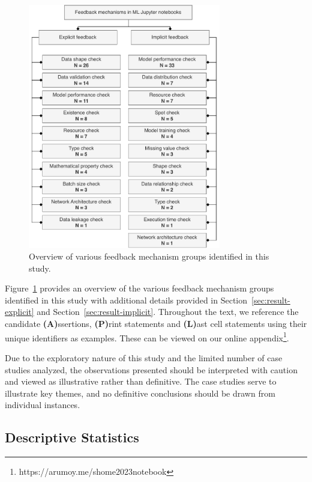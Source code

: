 \documentclass[smallextended]{svjour3}       %
\begin{document}
\begin{figure}
	\centering
	\includegraphics[width=0.75\textwidth]{taxonomy.pdf}
	\caption{Overview of various feedback mechanism groups identified in this study.}
	\label{fig:taxonomy}
\end{figure}

Figure~\ref{fig:taxonomy} provides an overview of the various feedback mechanism groups identified in this study with additional details provided in Section~\ref{sec:result-explicit} and Section~\ref{sec:result-implicit}. Throughout the text, we reference the candidate \textbf{(A)}ssertions, \textbf{(P)}rint statements and \textbf{(L)}ast cell statements using their unique identifiers as examples. These can be viewed on our online appendix\footnote{https://arumoy.me/shome2023notebook}.

Due to the exploratory nature of this study and the limited number of case studies analyzed, the observations presented should be interpreted with caution and viewed as illustrative rather than definitive. The case studies serve to illustrate key themes, and no definitive conclusions should be drawn from individual instances.

\subsection{Descriptive Statistics}
\end{document}
